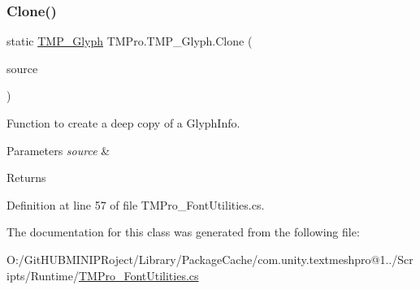 \subsubsection{\texorpdfstring{Clone()}{Clone()}}
{\footnotesize\ttfamily static \mbox{\hyperlink{class_t_m_pro_1_1_t_m_p___glyph}{T\+M\+P\+\_\+\+Glyph}} T\+M\+Pro.\+T\+M\+P\+\_\+\+Glyph.\+Clone (\begin{DoxyParamCaption}\item[{\mbox{\hyperlink{class_t_m_pro_1_1_t_m_p___glyph}{T\+M\+P\+\_\+\+Glyph}}}]{source }\end{DoxyParamCaption})\hspace{0.3cm}{\ttfamily [static]}}



Function to create a deep copy of a Glyph\+Info. 


\begin{DoxyParams}{Parameters}
{\em source} & \\
\hline
\end{DoxyParams}
\begin{DoxyReturn}{Returns}

\end{DoxyReturn}


Definition at line 57 of file T\+M\+Pro\+\_\+\+Font\+Utilities.\+cs.



The documentation for this class was generated from the following file\+:\begin{DoxyCompactItemize}
\item 
O\+:/\+Git\+H\+U\+B\+M\+I\+N\+I\+P\+Roject/\+Library/\+Package\+Cache/com.\+unity.\+textmeshpro@1../\+Scripts/\+Runtime/\mbox{\hyperlink{_t_m_pro___font_utilities_8cs}{T\+M\+Pro\+\_\+\+Font\+Utilities.\+cs}}\end{DoxyCompactItemize}
